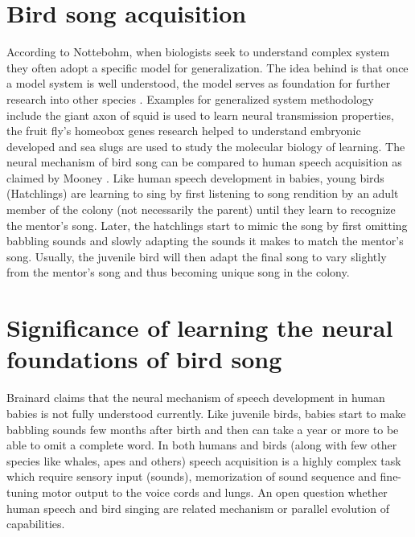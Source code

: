 \documentclass[draft,12pt,oneside]{CUNY_PhD}
\begin{document}
\section{Bird song acquisition}
According to Nottebohm, when biologists seek to understand complex system they often adopt a specific model for generalization. The idea behind is that once a model system is well understood, the model serves as foundation for further research into other species \cite{1}. Examples for generalized system methodology include the giant axon of squid is used to learn neural transmission properties, the fruit fly’s homeobox genes research helped to understand embryonic developed and sea slugs are used to study the molecular biology of learning. 
The neural mechanism of bird song can be compared to human speech acquisition as claimed by Mooney \cite{14}. Like human speech development in babies, young birds (Hatchlings) are learning to sing by first listening to song rendition by an adult member of the colony (not necessarily the parent) until they learn to recognize the mentor’s song. Later, the hatchlings start to mimic the song by first omitting babbling sounds and slowly adapting the sounds it makes to match the mentor’s song. Usually, the juvenile bird will then adapt the final song to vary slightly from the mentor’s song and thus becoming unique song in the colony.
\section{Significance of learning the neural foundations of bird song}
Brainard claims that the neural mechanism of speech development in human babies is not fully understood currently\cite{11}. Like juvenile birds, babies start to make babbling sounds few months after birth and then can take a year or more to be able to omit a complete word. In both humans and birds (along with few other species like whales, apes and others) speech acquisition is a highly complex task which require sensory input (sounds), memorization of sound sequence and fine-tuning motor output to the voice cords and lungs. An open question whether human speech and bird singing are related mechanism or parallel evolution of capabilities.
\end{document}
